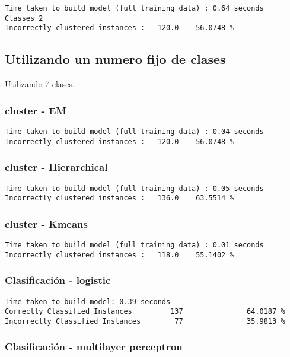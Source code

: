 \documentclass[a4paper]{article}
\begin{document}
\begin{verbatim}
Time taken to build model (full training data) : 0.64 seconds
Classes 2
Incorrectly clustered instances :	120.0	 56.0748 %
\end{verbatim}

\subsection{Utilizando un numero fijo de clases}
Utilizando 7 clases.

\subsubsection{cluster - EM}
\begin{verbatim}
Time taken to build model (full training data) : 0.04 seconds
Incorrectly clustered instances :	120.0	 56.0748 %
\end{verbatim}

\subsubsection{cluster - Hierarchical}

\begin{verbatim}
Time taken to build model (full training data) : 0.05 seconds
Incorrectly clustered instances :	136.0	 63.5514 %
\end{verbatim}

\subsubsection{cluster - Kmeans}

\begin{verbatim}
Time taken to build model (full training data) : 0.01 seconds
Incorrectly clustered instances :	118.0	 55.1402 %
\end{verbatim}


\subsubsection{Clasificación - logistic}

\begin{verbatim}
Time taken to build model: 0.39 seconds
Correctly Classified Instances         137               64.0187 %
Incorrectly Classified Instances        77               35.9813 %
\end{verbatim}


\subsubsection{Clasificación - multilayer perceptron}
\end{document}
